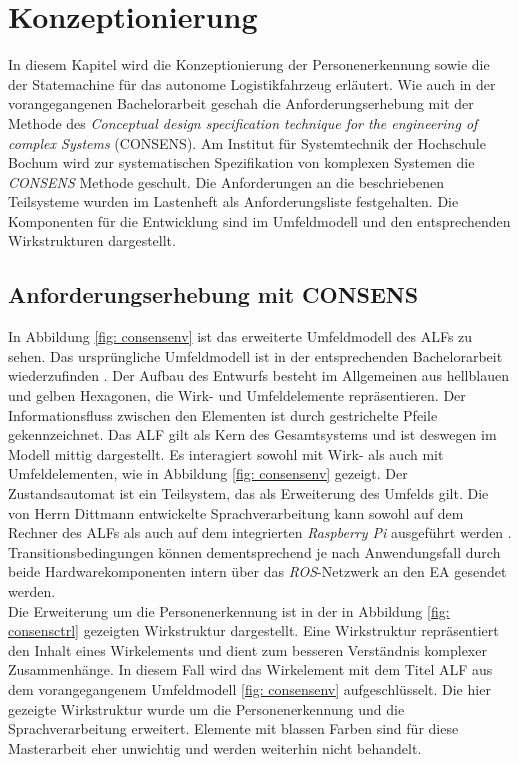 \chapter{Konzeptionierung}
\label{ch: Konzeptionierung}

In diesem Kapitel wird die Konzeptionierung der Personenerkennung sowie die der Statemachine für das autonome Logistikfahrzeug erläutert. Wie auch in der vorangegangenen Bachelorarbeit geschah die Anforderungserhebung mit der Methode des \textit{Conceptual design specification technique for the engineering of complex Systems} (CONSENS). Am Institut für Systemtechnik der Hochschule Bochum wird zur systematischen Spezifikation von komplexen Systemen die \textit{CONSENS} Methode geschult. Die Anforderungen an die beschriebenen Teilsysteme wurden im Lastenheft als Anforderungsliste festgehalten. Die Komponenten für die Entwicklung sind im Umfeldmodell und den entsprechenden Wirkstrukturen dargestellt.
	
	
	\section{Anforderungserhebung mit CONSENS}
	\label{sec: Anforderungserhebung}
	
	In Abbildung \ref{fig: consensenv} ist das erweiterte Umfeldmodell des ALFs zu sehen. Das ursprüngliche Umfeldmodell ist in der entsprechenden Bachelorarbeit wiederzufinden \cite{Bachelorarbeit}. Der Aufbau des Entwurfs besteht im Allgemeinen aus hellblauen und gelben Hexagonen, die Wirk- und Umfeldelemente repräsentieren. Der Informationsfluss zwischen den Elementen ist durch gestrichelte Pfeile gekennzeichnet. Das ALF gilt als Kern des Gesamtsystems und ist deswegen im Modell mittig dargestellt. Es interagiert sowohl mit Wirk- als auch mit Umfeldelementen, wie in Abbildung \ref{fig: consensenv} gezeigt. Der Zustandsautomat ist ein Teilsystem, das als Erweiterung des Umfelds gilt. Die von Herrn Dittmann entwickelte Sprachverarbeitung kann sowohl auf dem Rechner des ALFs als auch auf dem integrierten \textit{Raspberry Pi} ausgeführt werden \cite{Dittmann}. Transitionsbedingungen können dementsprechend je nach Anwendungsfall durch beide Hardwarekomponenten intern über das \textit{ROS}-Netzwerk an den EA gesendet werden.       \\
	
		
	
	Die Erweiterung um die Personenerkennung ist in der in Abbildung \ref{fig: consensctrl} gezeigten Wirkstruktur dargestellt. Eine Wirkstruktur repräsentiert den Inhalt eines Wirkelements und dient zum besseren Verständnis komplexer Zusammenhänge. In diesem Fall wird das Wirkelement mit dem Titel ALF aus dem vorangegangenem Umfeldmodell \ref{fig: consensenv} aufgeschlüsselt. Die hier gezeigte Wirkstruktur wurde um die Personenerkennung und die Sprachverarbeitung erweitert. Elemente mit blassen Farben sind für diese Masterarbeit eher unwichtig und werden weiterhin nicht behandelt.\\
	
